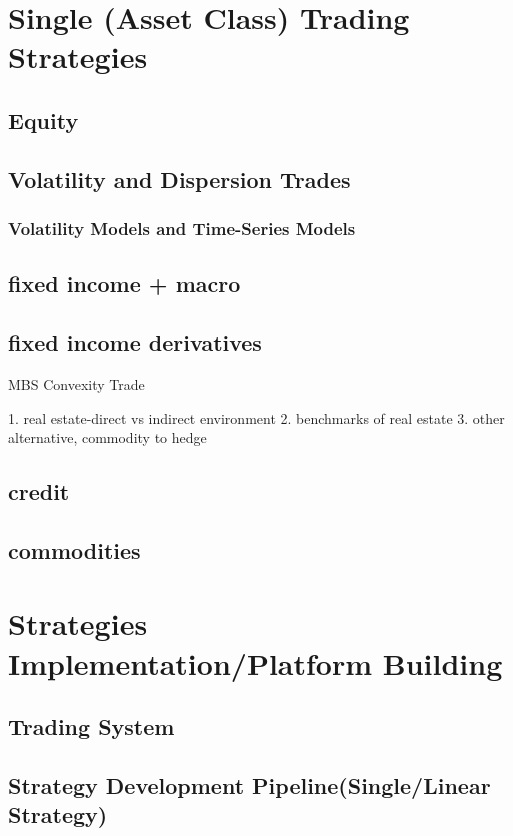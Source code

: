 \documentclass[11pt, openany]{book}              %
\begin{document}
\chapter{Single (Asset Class) Trading Strategies}
\section{Equity}
\section{Volatility and Dispersion Trades}
	\subsection{Volatility Models and Time-Series Models}
	
\section{fixed income + macro}
\section{fixed income derivatives}

MBS Convexity Trade

    1. real estate-direct vs indirect environment  
    2. benchmarks of real estate
    3. other alternative, commodity to hedge

\section{credit}
\section{commodities} 



\chapter{Strategies Implementation/Platform Building}
\section{ Trading System }
\section{ Strategy Development Pipeline(Single/Linear Strategy) }
\end{document}
